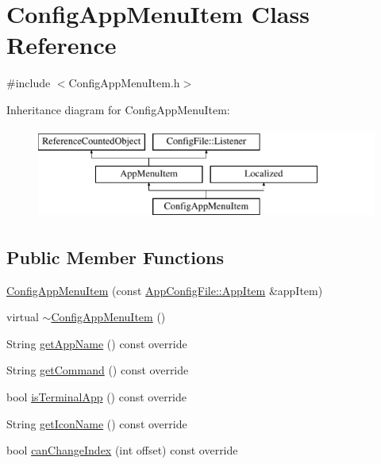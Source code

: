 \hypertarget{classConfigAppMenuItem}{}\section{Config\+App\+Menu\+Item Class Reference}
\label{classConfigAppMenuItem}


{\ttfamily \#include $<$Config\+App\+Menu\+Item.\+h$>$}

Inheritance diagram for Config\+App\+Menu\+Item\+:\begin{figure}[H]
\begin{center}
\leavevmode
\includegraphics[height=3.000000cm]{classConfigAppMenuItem}
\end{center}
\end{figure}
\subsection*{Public Member Functions}
\begin{DoxyCompactItemize}
\item 
\mbox{\hyperlink{classConfigAppMenuItem_ac310da919ec5dd0d462d15eacda9b00f}{Config\+App\+Menu\+Item}} (const \mbox{\hyperlink{structAppConfigFile_1_1AppItem}{App\+Config\+File\+::\+App\+Item}} \&app\+Item)
\item 
virtual \mbox{\hyperlink{classConfigAppMenuItem_ab8485e4ace7e6418dc857d08bd570bc7}{$\sim$\+Config\+App\+Menu\+Item}} ()
\item 
String \mbox{\hyperlink{classConfigAppMenuItem_a79678785733e59496daabe77c488c1b0}{get\+App\+Name}} () const override
\item 
String \mbox{\hyperlink{classConfigAppMenuItem_ada51b274c9d790f1bf5f9e84f878f0a4}{get\+Command}} () const override
\item 
bool \mbox{\hyperlink{classConfigAppMenuItem_ae986dacefb0b3fb79917452b4857d6ec}{is\+Terminal\+App}} () const override
\item 
String \mbox{\hyperlink{classConfigAppMenuItem_a63f0a259553e03a6f33336777c753f74}{get\+Icon\+Name}} () const override
\item 
bool \mbox{\hyperlink{classConfigAppMenuItem_a6a65535f73a82a093217843240ba7496}{can\+Change\+Index}} (int offset) const override
\end{DoxyCompactItemize}
